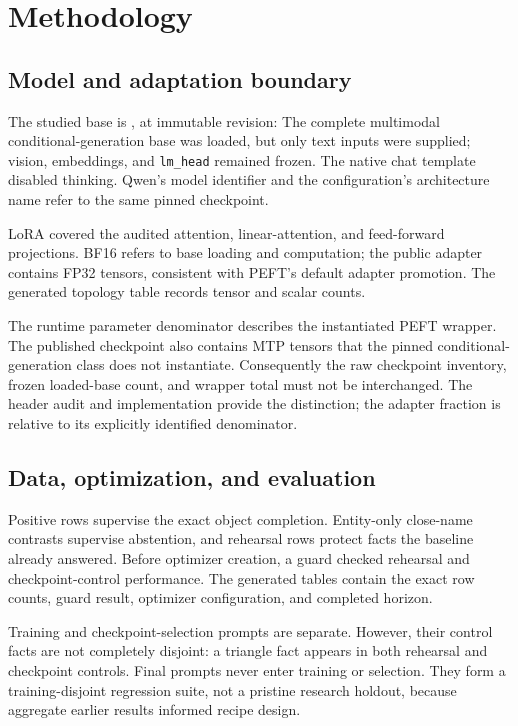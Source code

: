 \section{Methodology}
\label{sec:methodology}
\subsection{Model and adaptation boundary}
The studied base is \texttt{\StudyModel}, at immutable revision:
\Fingerprint{\StudyRevision}
The
complete multimodal conditional-generation base was loaded, but only text
inputs were supplied; vision, embeddings, and \verb|lm_head| remained frozen.
The native chat template disabled thinking. Qwen's model identifier and the
configuration's  architecture name refer
to the same pinned checkpoint.\citep{qwen38,qwen38config,qwen38tokenizer}

LoRA covered the audited attention, linear-attention, and feed-forward
projections. BF16 refers to base loading and computation; the public adapter
contains FP32 tensors, consistent with PEFT's default adapter promotion.
The generated topology table records tensor and scalar counts.
\citep{qwen38adapter,peftmapping,pefttuners}

The runtime parameter denominator describes the instantiated PEFT wrapper.
The published checkpoint also contains MTP tensors that the pinned
conditional-generation class does not instantiate. Consequently the raw
checkpoint inventory, frozen loaded-base count, and wrapper total must not be
interchanged. The header audit and implementation provide the distinction;
the adapter fraction is relative to its explicitly identified denominator.
\citep{qwen38index,qwen38config,transformersqwen35,hubsafetensors}

\subsection{Data, optimization, and evaluation}
Positive rows supervise the exact object completion. Entity-only close-name
contrasts supervise abstention, and rehearsal rows protect facts the baseline
already answered. Before optimizer creation, a guard checked rehearsal and
checkpoint-control performance. The generated tables contain the exact row
counts, guard result, optimizer configuration, and completed horizon.
\citep{qwen38data}

Training and checkpoint-selection prompts are separate. However, their
control facts are not completely disjoint: a triangle fact appears in both
rehearsal and checkpoint controls. Final prompts never enter training or
selection. They form a training-disjoint regression suite, not a pristine
research holdout, because aggregate earlier results informed recipe design.
\citep{qwen38data}

